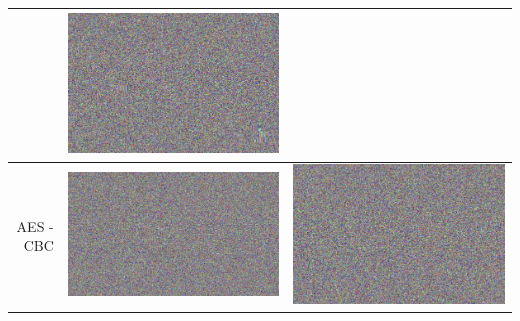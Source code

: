 \documentclass[fleqn, journal, onecolumn]{IEEEtran}             %
\theoremstyle{break}                                            %
\begin{document}
\begin{tabular}{|r || p{5cm} | p{5cm} | }
\begin{minipage}{.2\textwidth}
        \end{minipage}  & 
        \begin{minipage}{.2\textwidth}
          \includegraphics[width=\linewidth]{2AES1}
        \end{minipage}    
        \\\hline
        AES - CBC  &  
        \begin{minipage}{.2\textwidth}
          \includegraphics[width=\linewidth]{1AES2}
        \end{minipage}  & 
        \begin{minipage}{.2\textwidth}
          \includegraphics[width=\linewidth]{2AES2}

\end{minipage}
\end{tabular}
\end{document}

